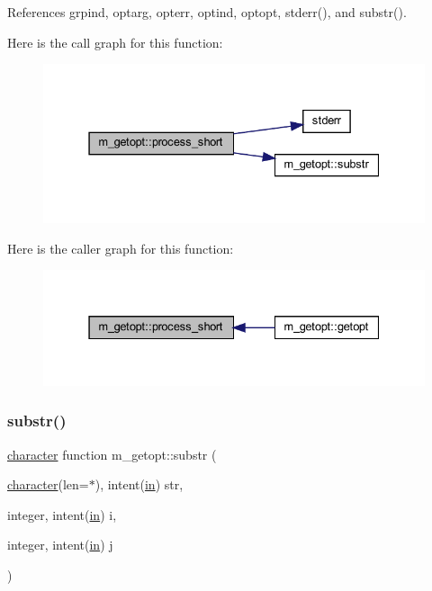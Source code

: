 References grpind, optarg, opterr, optind, optopt, stderr(), and substr().

Here is the call graph for this function\+:
\nopagebreak
\begin{figure}[H]
\begin{center}
\leavevmode
\includegraphics[width=331pt]{namespacem__getopt_a5a41350043ae3b92dbbac7dea6702e09_cgraph}
\end{center}
\end{figure}
Here is the caller graph for this function\+:
\nopagebreak
\begin{figure}[H]
\begin{center}
\leavevmode
\includegraphics[width=331pt]{namespacem__getopt_a5a41350043ae3b92dbbac7dea6702e09_icgraph}
\end{center}
\end{figure}
\mbox{\label{namespacem__getopt_a20145e0f477d81541fbe9b408f2194d0}} 
\subsubsection{\texorpdfstring{substr()}{substr()}}
{\footnotesize\ttfamily \hyperlink{option__stopwatch_83_8txt_abd4b21fbbd175834027b5224bfe97e66}{character} function m\+\_\+getopt\+::substr (\begin{DoxyParamCaption}\item[{\hyperlink{option__stopwatch_83_8txt_abd4b21fbbd175834027b5224bfe97e66}{character}(len=$\ast$), intent(\hyperlink{M__journal_83_8txt_afce72651d1eed785a2132bee863b2f38}{in})}]{str,  }\item[{integer, intent(\hyperlink{M__journal_83_8txt_afce72651d1eed785a2132bee863b2f38}{in})}]{i,  }\item[{integer, intent(\hyperlink{M__journal_83_8txt_afce72651d1eed785a2132bee863b2f38}{in})}]{j }\end{DoxyParamCaption})}

